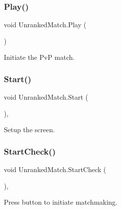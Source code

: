 \subsubsection{\texorpdfstring{Play()}{Play()}}
{\footnotesize\ttfamily void Unranked\+Match.\+Play (\begin{DoxyParamCaption}{ }\end{DoxyParamCaption})\hspace{0.3cm}{\ttfamily [inline]}}



Initiate the PvP match. 

\mbox{\label{class_unranked_match_a7361150ca22d5a53cdbfe4d34a6c94ea}} 
\subsubsection{\texorpdfstring{Start()}{Start()}}
{\footnotesize\ttfamily void Unranked\+Match.\+Start (\begin{DoxyParamCaption}{ }\end{DoxyParamCaption})\hspace{0.3cm}{\ttfamily [inline]}, {\ttfamily [private]}}



Setup the screen. 

\mbox{\label{class_unranked_match_a39c95f995b2fbaecfc07f24e9ec847a9}} 
\subsubsection{\texorpdfstring{StartCheck()}{StartCheck()}}
{\footnotesize\ttfamily void Unranked\+Match.\+Start\+Check (\begin{DoxyParamCaption}{ }\end{DoxyParamCaption})\hspace{0.3cm}{\ttfamily [inline]}, {\ttfamily [private]}}



Press button to initiate matchmaking. 

\mbox{\label{class_unranked_match_a11b0733dd14df9f9abcf75dfd7047172}} 
